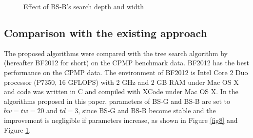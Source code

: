 \documentclass[review,3p,times,authoryear,12pt]{elsarticle}
\begin{document}
\begin{figure}[!htb]
\caption{Effect of BS-B's search depth and width}
\label{fig9}
\end{figure}

\subsection {Comparison with the existing approach}

The proposed algorithms were compared with the tree search algorithm by \cite{BF2012} (hereafter BF2012 for short) on the CPMP benchmark data.
BF2012 has the best performance on the CPMP data.
The environment of BF2012 is Intel Core 2 Duo processor (P7350, 16 GFLOPS) with 2 GHz and 2 GB RAM under Mac OS X and code was written in C and compiled with XCode under Mac OS X.
In the algorithms proposed in this paper, parameters of BS-G and BS-B are set to $\mathit{bw}=\mathit{tw}=20$ and $\mathit{td}=3$, since BS-G and BS-B become stable and the improvement is negligible if parameters increase, as shown in Figure \ref{fig8} and Figure \ref{fig9}.
\end{document}
